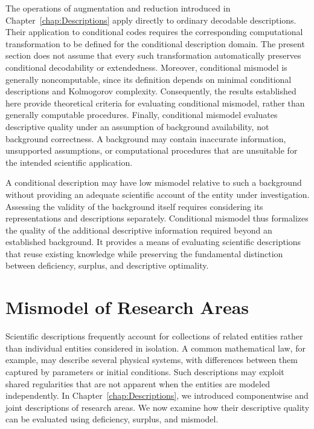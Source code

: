 The operations of augmentation and reduction introduced in Chapter~\ref{chap:Descriptions} apply directly to ordinary decodable descriptions. Their application to conditional codes requires the corresponding computational transformation to be defined for the conditional description domain. The present section does not assume that every such transformation automatically preserves conditional decodability or extendedness. Moreover, conditional mismodel is generally noncomputable, since its definition depends on minimal conditional descriptions and Kolmogorov complexity. Consequently, the results established here provide theoretical criteria for evaluating conditional mismodel, rather than generally computable procedures. Finally, conditional mismodel evaluates descriptive quality under an assumption of background availability, not background correctness. A background may contain inaccurate information, unsupported assumptions, or computational procedures that are unsuitable for the intended scientific application.

A conditional description may have low mismodel relative to such a background without providing an adequate scientific account of the entity under investigation. Assessing the validity of the background itself requires considering its representations and descriptions separately. Conditional mismodel thus formalizes the quality
of the additional descriptive information required beyond an established background. It provides a means of evaluating scientific descriptions that reuse existing knowledge while preserving the fundamental distinction between deficiency, surplus, and descriptive optimality.

%
%

\section{Mismodel of Research Areas}
\label{sec:mismodel_research_areas}

Scientific descriptions frequently account for collections of related entities rather than individual entities considered in isolation. A common mathematical law, for example, may describe several physical systems, with differences between them captured by parameters or initial conditions. Such descriptions may exploit shared regularities that are not apparent when the entities are modeled independently. In Chapter~\ref{chap:Descriptions}, we introduced componentwise and joint descriptions of research areas. We now examine how their descriptive quality can be evaluated using deficiency, surplus, and mismodel.

